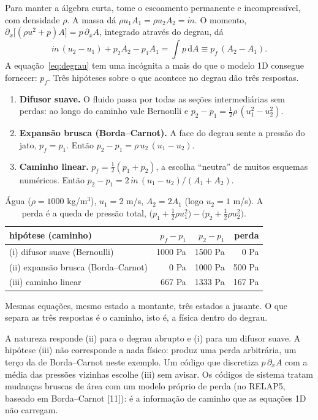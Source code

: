 \documentclass[11pt,a4paper]{article}
\theoremstyle{definition}
\theoremstyle{remark}
\newcommand{\dd}{\mathrm{d}}
\begin{document}
Para manter a álgebra curta, tome o escoamento permanente e incompressível, com densidade $\rho$. A massa dá $\rho u_1A_1=\rho u_2A_2=\dot m$. O momento, $\partial_x\big[(\rho u^2+p)A\big]=p\,\partial_xA$, integrado através do degrau, dá
\begin{equation}\label{eq:degrau}
\dot m\,(u_2-u_1)+p_2A_2-p_1A_1=\int p\,\dd A\equiv p_f\,(A_2-A_1).
\end{equation}
A equação~\eqref{eq:degrau} tem uma incógnita a mais do que o modelo 1D consegue fornecer: $p_f$. Três hipóteses sobre o que acontece no degrau dão três respostas.
\begin{enumerate}[label=(\roman*)]
\item \textbf{Difusor suave.} O fluido passa por todas as seções intermediárias sem perdas: ao longo do caminho vale Bernoulli e $p_2-p_1=\tfrac12\rho\,(u_1^2-u_2^2)$.
\item \textbf{Expansão brusca (Borda--Carnot).} A face do degrau sente a pressão do jato, $p_f=p_1$. Então $p_2-p_1=\rho\,u_2\,(u_1-u_2)$.
\item \textbf{Caminho linear.} $p_f=\tfrac12(p_1+p_2)$, a escolha ``neutra'' de muitos esquemas numéricos. Então $p_2-p_1=2\,\dot m\,(u_1-u_2)/(A_1+A_2)$.
\end{enumerate}

\begin{table}[h]
\centering\small
\caption{Água ($\rho=1000$ kg/m$^3$), $u_1=2$ m/s, $A_2=2A_1$ (logo $u_2=1$ m/s). A perda é a queda de pressão total, $\big(p_1+\tfrac12\rho u_1^2\big)-\big(p_2+\tfrac12\rho u_2^2\big)$.}\label{tab:duto}
\begin{tabular}{@{}lrrr@{}}
\toprule
hipótese (caminho) & $p_f-p_1$ & $p_2-p_1$ & perda\\
\midrule
(i) difusor suave (Bernoulli) & 1000 Pa & 1500 Pa & 0 Pa\\
(ii) expansão brusca (Borda--Carnot) & 0 Pa & 1000 Pa & 500 Pa\\
(iii) caminho linear & 667 Pa & 1333 Pa & 167 Pa\\
\bottomrule
\end{tabular}
\end{table}

\begin{mensagem}
Mesmas equações, mesmo estado a montante, três estados a jusante. O que separa as três respostas é o caminho, isto é, a física dentro do degrau.
\end{mensagem}

A natureza responde (ii) para o degrau abrupto e (i) para um difusor suave. A hipótese (iii) não corresponde a nada físico: produz uma perda arbitrária, um terço da de Borda--Carnot neste exemplo. Um código que discretiza $p\,\partial_xA$ com a média das pressões vizinhas escolhe (iii) sem avisar. Os códigos de sistema tratam mudanças bruscas de área com um modelo próprio de perda (no RELAP5, baseado em Borda--Carnot [11]): é a informação de caminho que as equações 1D não carregam.
\end{document}
